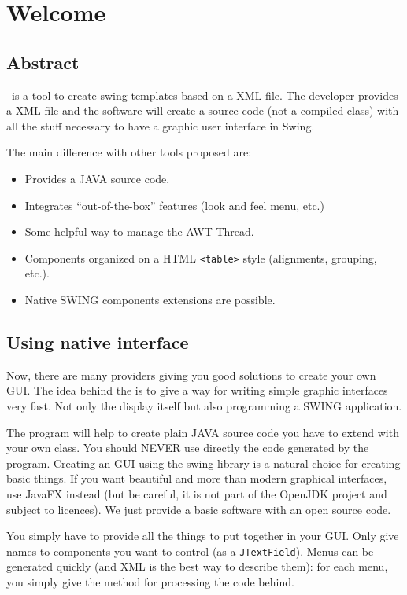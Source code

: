 \chapter{Welcome}
\section{Abstract}
\xmlswing\ is a tool to create swing templates based on a
XML file. The developer provides a XML file and the software
will create a source code (not a compiled class) with all
the stuff necessary to have a graphic user interface in Swing.

The main difference with other tools proposed are:
\begin{itemize}
  \item Provides a JAVA source code.
  \item Integrates ``out-of-the-box'' features (look and
  		feel menu, etc.)
  \item Some helpful way to manage the AWT-Thread.
  \item Components organized on a HTML \verb|<table>| style (alignments,
  			grouping, etc.).
  \item Native SWING components extensions are possible.
\end{itemize}


\section{Using native interface}
Now, there are many providers giving you good solutions to create
your own GUI. The idea behind the \xmlswing{} is to give a way
for writing simple graphic interfaces very fast. Not only the
display itself but also programming a SWING application.


The program will help to create plain JAVA source code you have to
extend with your own class. You should NEVER use directly the code generated
by the program. Creating an GUI using the swing library is a natural
choice for creating basic things. If you want beautiful and more than
modern graphical interfaces, use JavaFX instead (but be careful, it is not 
part of the OpenJDK project and subject to licences). We just provide a
basic software with an open source code.

You simply have to provide all the things to put together in your GUI.
Only give names to components you want to control
(as a \verb|JTextField|). Menus can be generated quickly (and XML is
the best way to describe them): for each menu, you simply give the method
for processing the code behind.
 

